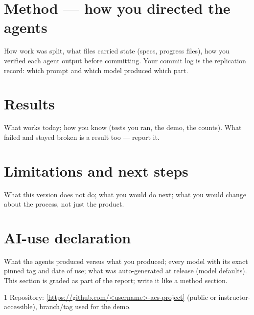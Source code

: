 \documentclass[a4paper]{article}
\begin{document}
\section{Method --- how you directed the agents}
How work was split, what files carried state (specs, progress files), how you
verified each agent output before committing. Your commit log is the
replication record: which prompt and which model produced which part.

\section{Results}
What works today; how you know (tests you ran, the demo, the counts). What
failed and stayed broken is a result too --- report it.

\section{Limitations and next steps}
What this version does not do; what you would do next; what you would change
about the process, not just the product.

\section{AI-use declaration}
What the agents produced versus what you produced; every model with its exact
pinned tag and date of use; what was auto-generated at release (model defaults).
This section is graded as part of the report; write it like a method section.

\small
\begin{thebibliography}{1}
 Repository: \url{[https://github.com/<username>-acs-project]} (public or instructor-accessible), branch/tag used for the demo.
\end{thebibliography}
\end{document}
